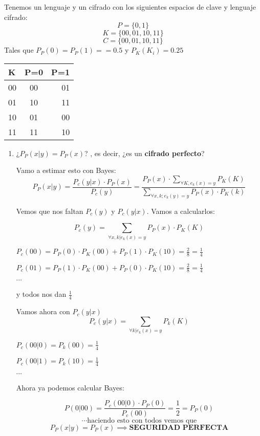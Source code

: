 \begin{example}
	Tenemos un lenguaje y un cifrado con los siguientes espacios de clave y lenguaje cifrado:
	$$P = \{0,1\}$$
	$$K= \{00,01,10,11\}$$
	$$C = \{00,01,10,11\}$$
	Tales que $P_P(0) = P_P(1) = =0.5$ y $P_K(K_i) = 0.25$
	
		\begin{center}
			
			\begin{tabular}{l | c | r}
				K & P=0 & P=1\\
				\hline
				00 & 00 & 01 \\
				\hline
				01 & 10 & 11\\
				\hline
				10 & 01 & 00\\
				\hline
				11 & 11 & 10
				
			\end{tabular}
		\end{center}
	
	\begin{enumerate}
		\item ¿$P_P(x|y) = P_P(x)$? , es decir, ¿es un \textbf{cifrado perfecto}?
		
		Vamo a estimar esto con Bayes:
		$$P_P(x|y) = \frac{P_c(y|x) \cdot P_P(x)}{P_c(y)} = \frac{P_P(x) \cdot \sum_{\forall K, e_k(x) = y}P_K(K)}{\sum_{\forall x,k ; e_k(y)=y}P_P(x)\cdot P_K(k)}$$
		
		Vemos que nos faltan $P_c(y)$ y $P_c(y|x)$. Vamos a calcularlos:
		
		$$P_c(y) = \sum_{\forall x,k|e_k(x)=y} P_P(x) \cdot P_K(K)$$
		
		$P_c(00) = P_P(0)\cdot P_K(00) + P_P(1)\cdot P_K(10) = \frac{2}{8} = \frac{1}{4}$
		
		$P_c(01) = P_P(1)\cdot P_K(00) + P_P(0)\cdot P_K(10) = \frac{2}{8} = \frac{1}{4}$
		
		$\cdots$
		
		y todos nos dan $\frac{1}{4}$
		
		Vamos ahora con $P_c(y|x)$
		$$P_c(y|x) = \sum_{\forall k |e_k(x)=y} P_k(K)$$
		
		$P_c (00|0) = P_k(00) = \frac{1}{4}$
		
		$P_c (00|1) = P_k(10) = \frac{1}{4}$
		
		$\cdots$
		
		Ahora ya podemos calcular Bayes:
		
		$$P(0|00) = \frac{P_c(00|0) \cdot P_P(0)}{P_c(00)} = \frac{1}{2} = P_P(0)$$
		$$\cdots  \text{haciendo esto con todos vemos que}$$
		$$P_P(x|y) = P_P(x) \implies \textbf{SEGURIDAD PERFECTA}$$
		

\end{enumerate}
\end{example}
